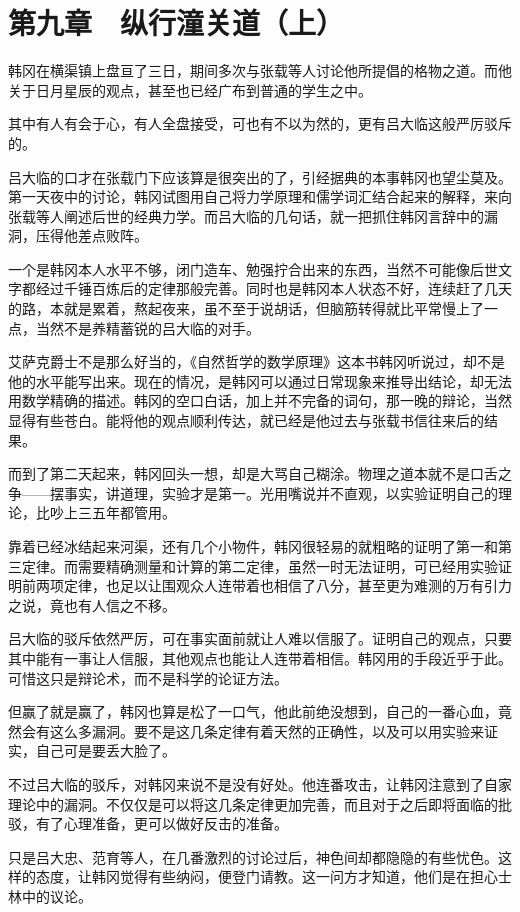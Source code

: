 \section{第九章　纵行潼关道（上）}

韩冈在横渠镇上盘亘了三日，期间多次与张载等人讨论他所提倡的格物之道。而他关于日月星辰的观点，甚至也已经广布到普通的学生之中。

其中有人有会于心，有人全盘接受，可也有不以为然的，更有吕大临这般严厉驳斥的。

吕大临的口才在张载门下应该算是很突出的了，引经据典的本事韩冈也望尘莫及。第一天夜中的讨论，韩冈试图用自己将力学原理和儒学词汇结合起来的解释，来向张载等人阐述后世的经典力学。而吕大临的几句话，就一把抓住韩冈言辞中的漏洞，压得他差点败阵。

一个是韩冈本人水平不够，闭门造车、勉强拧合出来的东西，当然不可能像后世文字都经过千锤百炼后的定律那般完善。同时也是韩冈本人状态不好，连续赶了几天的路，本就是累着，熬起夜来，虽不至于说胡话，但脑筋转得就比平常慢上了一点，当然不是养精蓄锐的吕大临的对手。

艾萨克爵士不是那么好当的，《自然哲学的数学原理》这本书韩冈听说过，却不是他的水平能写出来。现在的情况，是韩冈可以通过日常现象来推导出结论，却无法用数学精确的描述。韩冈的空口白话，加上并不完备的词句，那一晚的辩论，当然显得有些苍白。能将他的观点顺利传达，就已经是他过去与张载书信往来后的结果。

而到了第二天起来，韩冈回头一想，却是大骂自己糊涂。物理之道本就不是口舌之争——摆事实，讲道理，实验才是第一。光用嘴说并不直观，以实验证明自己的理论，比吵上三五年都管用。

靠着已经冰结起来河渠，还有几个小物件，韩冈很轻易的就粗略的证明了第一和第三定律。而需要精确测量和计算的第二定律，虽然一时无法证明，可已经用实验证明前两项定律，也足以让围观众人连带着也相信了八分，甚至更为难测的万有引力之说，竟也有人信之不移。

吕大临的驳斥依然严厉，可在事实面前就让人难以信服了。证明自己的观点，只要其中能有一事让人信服，其他观点也能让人连带着相信。韩冈用的手段近乎于此。可惜这只是辩论术，而不是科学的论证方法。

但赢了就是赢了，韩冈也算是松了一口气，他此前绝没想到，自己的一番心血，竟然会有这么多漏洞。要不是这几条定律有着天然的正确性，以及可以用实验来证实，自己可是要丢大脸了。

不过吕大临的驳斥，对韩冈来说不是没有好处。他连番攻击，让韩冈注意到了自家理论中的漏洞。不仅仅是可以将这几条定律更加完善，而且对于之后即将面临的批驳，有了心理准备，更可以做好反击的准备。

只是吕大忠、范育等人，在几番激烈的讨论过后，神色间却都隐隐的有些忧色。这样的态度，让韩冈觉得有些纳闷，便登门请教。这一问方才知道，他们是在担心士林中的议论。

